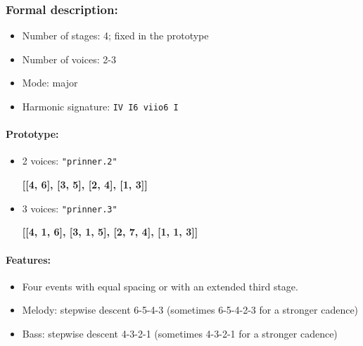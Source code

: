 \documentclass[11pt, openany]{article}
\begin{document}
\subsubsection{Formal description:}
\begin{itemize}
\item Number of stages: 4; fixed in the prototype
\item Number of voices: 2-3
\item Mode: major
\item Harmonic signature: \texttt{IV I6 viio6 I}
\end{itemize}

\paragraph{Prototype:}
\begin{itemize}
\item 2 voices: \texttt{"prinner.2"}
	\begin{center}
	\textbf{[[4, 6], [3, 5], [2, 4], [1, 3]]}
	\end{center}
\item 3 voices: \texttt{"prinner.3"}
	\begin{center}
	\textbf{[[4, 1,  6], [3, 1, 5], [2, 7, 4], [1, 1, 3]]}
	\end{center}
\end{itemize}

\paragraph{Features:}
\begin{itemize}
\item Four events with equal spacing or with an extended third stage.
\item Melody: stepwise descent 6-5-4-3 (sometimes 6-5-4-2-3 for a stronger cadence)
\item Bass: stepwise descent 4-3-2-1 (sometimes 4-3-2-1 for a stronger cadence)
\end{itemize}
\end{document}
